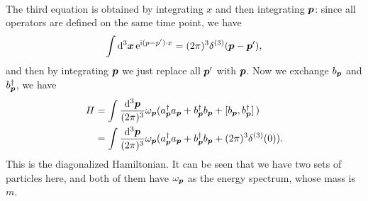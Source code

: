 \documentclass[hyperref, a4paper]{article}
\newcommand*{\ii}{\mathrm{i}}
\newcommand*{\ee}{\mathrm{e}}
\begin{document}
\begin{itemize}
\[\begin{aligned}
        \end{aligned}
    \]
    The third equation is obtained by integrating $x$ and then integrating $\vb*{p}$: since all operators are defined on the same time point, we have 
    \[
        \int \dd[3]{\vb*{x}} \ee^{\ii (p - p') \cdot x} = (2\pi)^3 \delta^{(3)}(\vb*{p} - \vb*{p}'),
    \]
    and then by integrating $\vb*{p}$ we just replace all $\vb*{p}'$ with $\vb*{p}$.
    Now we exchange $b_{\vb*{p}}$ and $b^\dagger_{\vb*{p}}$, we have 
    \begin{equation}
        \begin{aligned}
            H &= \int \frac{\dd[3]{\vb*{p}}}{(2\pi)^3} \omega_{\vb*{p}} (a^\dagger_{\vb*{p}} a_{\vb*{p}} + b^\dagger_{\vb*{p}} b_{\vb*{p}} + \comm*{b_{\vb*{p}}}{b^\dagger_{\vb*{p}}}) \\
            &= \int \frac{\dd[3]{\vb*{p}}}{(2\pi)^3} \omega_{\vb*{p}} (a^\dagger_{\vb*{p}} a_{\vb*{p}} + b^\dagger_{\vb*{p}} b_{\vb*{p}} + (2\pi)^3 \delta^{(3)}(0)).
        \end{aligned}
    \end{equation}
    This is the diagonalized Hamiltonian. It can be seen that we have two sets of particles here, and both of them have $\omega_{\vb*{p}}$ as the energy spectrum, whose mass is $m$.


\end{itemize}
\end{document}
